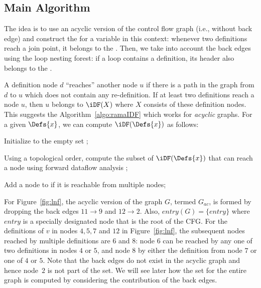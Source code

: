 {\subsection{Main Algorithm}

The idea is to use an acyclic version of the control flow graph (i.e., without 
back edge) and construct the \iDF for a variable in this context: whenever two 
definitions reach a join point, it belongs to the \iDF. Then, we take into 
account the back edges using the loop nesting forest: if a loop contains a 
definition, its header also belongs to the \iDF.

\medskip
    
A definition node $d$ ``reaches'' another node $u$ if there is a path in the 
graph from $d$ to $u$ which does not contain any re-definition. If at least two 
definitions reach a node $u$, then $u$ belongs to $\iDF(X)$ where $X$ consists 
of these definition nodes. This suggests the Algorithm~\ref{algo:ramaIDF} which 
works for \emph{acyclic} graphs.
For a given $\Defs{x}$, we can compute $\iDF(\Defs{x})$ as follows:

\begin{itemize}
\item { Initialize \iDF to the empty set };
\item { Using a topological order, compute the subset of $\iDF(\Defs{x})$ that can reach a node using forward dataflow analysis };
{\item} {Add a node to \iDF if it is reachable from multiple nodes};
\end{itemize}  

For Figure~\ref{fig:lnf}, the acyclic version of the graph $G$, termed 
$G_{\textit{ac}}$, is formed by dropping the back edges $11 \rightarrow 9$ and $12 
\rightarrow 2$. Also, $\textit{entry}(G) = \{\textit{entry}\}$ where 
$\textit{entry}$ is a specially designated node that is the root of the 
CFG. For the definitions of $v$ in nodes $4,5,7$ and $12$ in 
Figure~\ref{fig:lnf}, the subsequent nodes reached by multiple definitions 
are $6$ and $8$: node $6$ can be reached by any one of two definitions in 
nodes $4$ or $5$, and node $8$ by either the definition from node 
$7$ or one of $4$ or $5$. Note that the back edges do not exist in the 
acyclic graph and hence node~$2$ is not part of the \iDF set. We will see 
later how the \iDF set for the entire graph is computed by considering the 
contribution of the back edges. 




}
